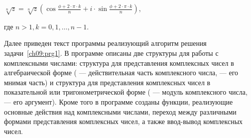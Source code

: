  $\sqrt[n]z=\sqrt[n]z(\cos \frac{\phi+2\cdot \pi \cdot k}{n}+i\cdot \sin \frac{\phi+2\cdot \pi \cdot k}{n})$,

где  $n>1,k=0,1,\dots,n-1$.

Далее приведен текст программы реализующий алгоритм решения задачи~\ref{ch09:prg1}. В программе описаны две структуры для
работы с комплексными числами: структура  для представления комплексных чисел в
алгебраической форме ( --- действительная часть комплексного числа,  --- его
мнимая часть) и структура  для представления комплексных чисел в показательной или
тригонометрической форме ( --- модуль комплексного числа,  --- его
аргумент). Кроме того в программе созданы функции, реализующие основные действия над комплексными числами, переход
между различными формами представления комплексных чисел, а также ввод-вывод комплексных чисел. 

